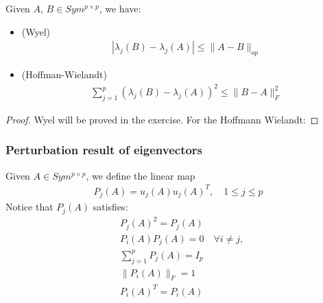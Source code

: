 \begin{theorem}
Given $A$, $B \in Sym^{p\times p}$, we have:
\begin{itemize}
	\item (Wyel)
	\begin{align*}
		|\lambda_j(B) - \lambda_j(A)| \leq \|A - B\|_{op}
	\end{align*}
	\item(Hoffman-Wielandt)
	\begin{align*}
		\sum_{j = 1}^p (\lambda_j(B) - \lambda_j(A))^2 \le \|B - A\|_F^2
	\end{align*}
\end{itemize}
\end{theorem}
\begin{proof}
	Wyel will be proved in the exercise. For the Hoffmann Wielandt:
\end{proof}



\subsubsection*{Perturbation result of eigenvectors}
\begin{definition}[Eigenprojection]
	Given $A \in Sym^{p\times p}$, we define the linear map
	\begin{align*}
		P_j(A) = u_j(A)u_j(A)^T, \quad 1 \le j \le p
	\end{align*}
	Notice that $P_j(A)$ satisfies:
	\begin{align*}
		&P_j(A)^2 = P_j(A)\\
		&P_i(A)P_j(A) = 0 \quad \forall i \neq j, \\
		&\sum_{j = 1}^pP_j(A) = I_p \\
		&\|P_i(A)\|_F = 1 \\
		&P_i(A)^T = P_i(A)\\
	\end{align*}
\end{definition}

